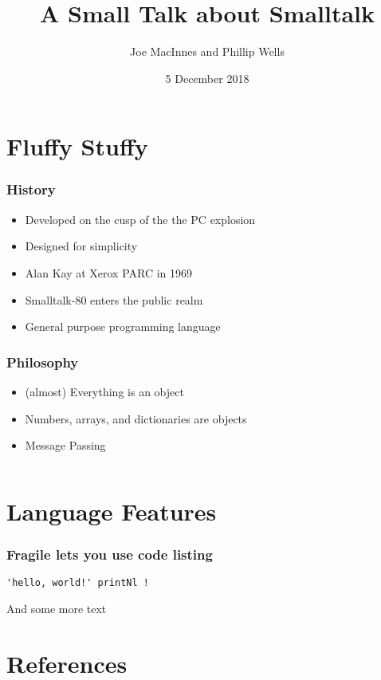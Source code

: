 \documentclass{beamer}
\title{A Small Talk about Smalltalk}
\author{Joe MacInnes and Phillip Wells}
\institute[College of Wooster]
{
  College of Wooster\\
  Programming Languages
}
\date{5 December 2018}
\begin{document}
\frame{\titlepage}
\section{Fluffy Stuffy}

\begin{frame}
  \frametitle{History}
  	\begin{itemize}
	\item Developed on the cusp of the the PC explosion
	\item Designed for simplicity
	\item Alan Kay at Xerox PARC in 1969
	\item Smalltalk-80 enters the public realm
	\item General purpose programming language
	\end{itemize}
  	
\end{frame}

\begin{frame}
  \frametitle{Philosophy}
  	\begin{itemize}
	\item (almost) Everything is an object
	\item Numbers, arrays, and dictionaries are objects
	\item Message Passing
	\end{itemize}
\begin{columns}[t]
\begin{column}{.1\textwidth}
\end{column}
\begin{column}{.3\textwidth}
\end{column}

\end{columns}
\end{frame}


\section{Language Features}

\begin{frame}[fragile] 
  \frametitle{Fragile lets you use code listing}

  \begin{lstlisting}[frame=single]
    'hello, world!' printNl !
  \end{lstlisting}

  And some more text

\end{frame}


\section{References} 


\end{document}
